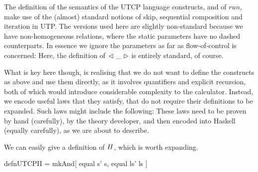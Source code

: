 The definition of the semantics of the UTCP language
constructs, and of $run$,
make use of the (almost) standard notions of skip,
sequential composition
and iteration in UTP.
The versions used here are slightly non-standard because we have
non-homogeneous relations,
where the static parameters have no dashed counterparts.
In essence we ignore the parameters as far as flow-of-control is concerned:
Here, the definition of $\mathrel{\lhd ~ {\_} ~ \rhd}$ is entirely standard, of course.

What is key here though,
is realising that we do not want to define the constructs
as above and use them directly, as it involves
quantifiers and explicit recursion,
both of which would introduce considerable complexity to the calculator.
Instead, we encode useful laws that they satisfy,
that do not require their definitions to be expanded.
Such laws might include the following:
These laws need to be proven by hand (carefully),
by the theory developer, and then encoded into Haskell
(equally carefully), as we are about to describe.

We can easily give a definition of $\mathit{II}$,
which is worth expanding.
\begin{code}
defnUTCPII = mkAnd[ equal s' s, equal ls' ls ]
\end{code}

